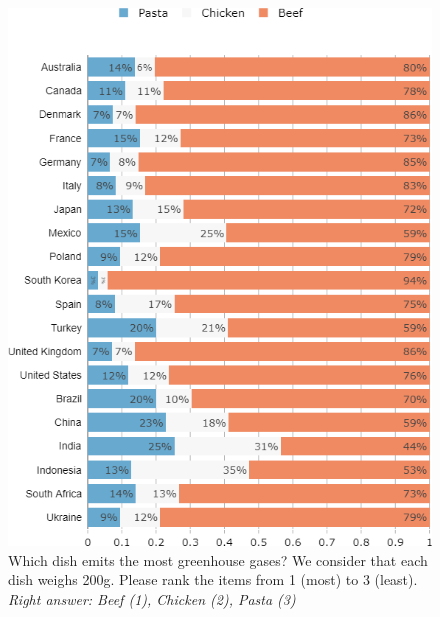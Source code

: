 \begin{frame}{}%
	\begin{figure}
	\caption{Which dish emits the most greenhouse gases? We consider that each dish weighs 200g.
	Please rank the items from 1 (most) to 3 (least).
	\footnotesize{\textit{Right answer: Beef (1), Chicken (2), Pasta (3)}}}
	\includegraphics[height=.8\paperheight]{../figures/country_comparison/footprint_food_countries_most.png}
	\end{figure}
\end{frame}
	
